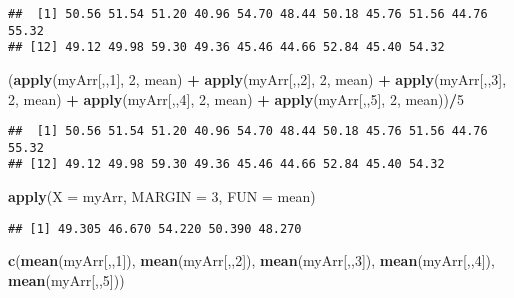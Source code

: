 \documentclass[]{book}
\newenvironment{Shaded}{\begin{snugshade}}{\end{snugshade}}
\newcommand{\KeywordTok}[1]{\textcolor[rgb]{0.13,0.29,0.53}{\textbf{#1}}}
\newcommand{\DataTypeTok}[1]{\textcolor[rgb]{0.13,0.29,0.53}{#1}}
\newcommand{\DecValTok}[1]{\textcolor[rgb]{0.00,0.00,0.81}{#1}}
\newcommand{\StringTok}[1]{\textcolor[rgb]{0.31,0.60,0.02}{#1}}
\newcommand{\OperatorTok}[1]{\textcolor[rgb]{0.81,0.36,0.00}{\textbf{#1}}}
\newcommand{\NormalTok}[1]{#1}
\theoremstyle{definition}
\theoremstyle{definition}
\theoremstyle{definition}
\theoremstyle{remark}
\begin{document}
\begin{verbatim}
##  [1] 50.56 51.54 51.20 40.96 54.70 48.44 50.18 45.76 51.56 44.76 55.32
## [12] 49.12 49.98 59.30 49.36 45.46 44.66 52.84 45.40 54.32
\end{verbatim}

\begin{Shaded}
\begin{Highlighting}[]
\NormalTok{(}\KeywordTok{apply}\NormalTok{(myArr[,,}\DecValTok{1}\NormalTok{], }\DecValTok{2}\NormalTok{, mean) }\OperatorTok{+}\StringTok{ }\KeywordTok{apply}\NormalTok{(myArr[,,}\DecValTok{2}\NormalTok{], }\DecValTok{2}\NormalTok{, mean) }\OperatorTok{+}\StringTok{ }
\StringTok{  }\KeywordTok{apply}\NormalTok{(myArr[,,}\DecValTok{3}\NormalTok{], }\DecValTok{2}\NormalTok{, mean) }\OperatorTok{+}\StringTok{ }\KeywordTok{apply}\NormalTok{(myArr[,,}\DecValTok{4}\NormalTok{], }\DecValTok{2}\NormalTok{, mean) }\OperatorTok{+}\StringTok{ }
\StringTok{  }\KeywordTok{apply}\NormalTok{(myArr[,,}\DecValTok{5}\NormalTok{], }\DecValTok{2}\NormalTok{, mean))}\OperatorTok{/}\DecValTok{5}
\end{Highlighting}
\end{Shaded}

\begin{verbatim}
##  [1] 50.56 51.54 51.20 40.96 54.70 48.44 50.18 45.76 51.56 44.76 55.32
## [12] 49.12 49.98 59.30 49.36 45.46 44.66 52.84 45.40 54.32
\end{verbatim}

\begin{Shaded}
\begin{Highlighting}[]
\KeywordTok{apply}\NormalTok{(}\DataTypeTok{X =}\NormalTok{ myArr, }\DataTypeTok{MARGIN =} \DecValTok{3}\NormalTok{, }\DataTypeTok{FUN =}\NormalTok{ mean)}
\end{Highlighting}
\end{Shaded}

\begin{verbatim}
## [1] 49.305 46.670 54.220 50.390 48.270
\end{verbatim}

\begin{Shaded}
\begin{Highlighting}[]
\KeywordTok{c}\NormalTok{(}\KeywordTok{mean}\NormalTok{(myArr[,,}\DecValTok{1}\NormalTok{]), }\KeywordTok{mean}\NormalTok{(myArr[,,}\DecValTok{2}\NormalTok{]), }\KeywordTok{mean}\NormalTok{(myArr[,,}\DecValTok{3}\NormalTok{]), }
  \KeywordTok{mean}\NormalTok{(myArr[,,}\DecValTok{4}\NormalTok{]), }\KeywordTok{mean}\NormalTok{(myArr[,,}\DecValTok{5}\NormalTok{]))}
\end{Highlighting}
\end{Shaded}
\end{document}

